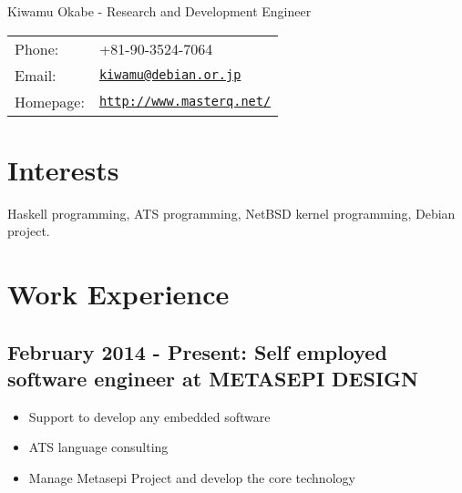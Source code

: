 \documentclass[letterpaper]{article}
\def\name{Kiwamu Okabe - Research and Development Engineer}
\begin{document}
{\huge \name}


\vspace{0.25in}

\begin{minipage}{0.3\linewidth}
  \begin{tabular}{ll}
    Phone: & +81-90-3524-7064 \\
    Email: & \href{mailto:kiwamu@debian.or.jp}{\tt kiwamu@debian.or.jp} \\
    Homepage: & \href{http://www.masterq.net/}{\tt http://www.masterq.net/} \\
  \end{tabular}
\end{minipage}

\section*{Interests}

Haskell programming, ATS programming, NetBSD kernel programming, Debian project.


\section*{Work Experience}
\subsection*{February 2014 - Present: Self employed software engineer at METASEPI DESIGN}

\begin{itemize}
  \item Support to develop any embedded software
  \item ATS language consulting
  \item Manage Metasepi Project and develop the core technology
\end{itemize}
\end{document}
